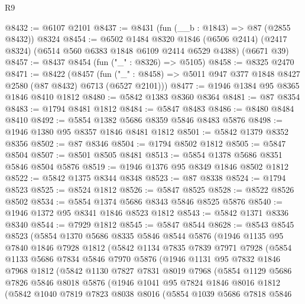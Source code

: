 \begin{lexlean}{R9}
\begin{coremodule}
@8432 := @6107 @2101
@8437 := @8431 (fun (__b : @1843) => @87 (@2855 @8432)) @8324
@8454 := @6502
    @1484
    @8320
    @1846
    (@6506 @2414)
    (@2417 @8324)
    (@6514 @560 @6383 @1848 @6109 @2414 @6529 @4388)
    (@6671 @39)
@8457 := @8437 @8454 (fun ("_" : @8326) => @5105)
@8458 := @8325 @2470
@8471 := @8422
    (@8457 (fun ("_" : @8458) => @5011 @947 @377 @1848 @8427 @2580 (@87 @8432) @6713 (@6527 @2101)))
@8477 := @1946 @1384 @95 @8365 @1846 @8410 @1812
@8480 := @5842 @1383 @8360 @8364
@8481 := @87 @8354
@8483 := @1794 @8481 @1812
@8484 := @5847 @8483
@8486 := @8480 @8484 @8410
@8492 := @5854 @1382 @5686 @8359 @5846 @8483 @5876
@8498 := @1946 @1380 @95 @8357 @1846 @8481 @1812
@8501 := @5842 @1379 @8352 @8356
@8502 := @87 @8346
@8504 := @1794 @8502 @1812
@8505 := @5847 @8504
@8507 := @8501 @8505 @8481
@8513 := @5854 @1378 @5686 @8351 @5846 @8504 @5876
@8519 := @1946 @1376 @95 @8349 @1846 @8502 @1812
@8522 := @5842 @1375 @8344 @8348
@8523 := @87 @8338
@8524 := @1794 @8523
@8525 := @8524 @1812
@8526 := @5847 @8525
@8528 := @8522 @8526 @8502
@8534 := @5854 @1374 @5686 @8343 @5846 @8525 @5876
@8540 := @1946 @1372 @95 @8341 @1846 @8523 @1812
@8543 := @5842 @1371 @8336 @8340
@8544 := @7929 @1812
@8545 := @5847 @8544
@8628 := @8543
    @8545
    @8523
    (@5854
      @1370
      @5686
      @8335
      @5846
      @8544
      @5876
      (@1946
        @1135
        @95
        @7840
        @1846
        @7928
        @1812
        (@5842
          @1134
          @7835
          @7839
          @7971
          @7928
          (@5854
            @1133
            @5686
            @7834
            @5846
            @7970
            @5876
            (@1946
              @1131
              @95
              @7832
              @1846
              @7968
              @1812
              (@5842
                @1130
                @7827
                @7831
                @8019
                @7968
                (@5854
                  @1129
                  @5686
                  @7826
                  @5846
                  @8018
                  @5876
                  (@1946
                    @1041
                    @95
                    @7824
                    @1846
                    @8016
                    @1812
                    (@5842
                      @1040
                      @7819
                      @7823
                      @8038
                      @8016
                      (@5854
                        @1039
                        @5686
                        @7818
                        @5846

\end{coremodule}
\end{lexlean}
